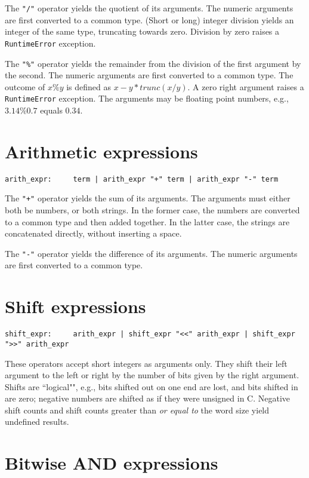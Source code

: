 The \verb|"/"| operator yields the quotient of its arguments.
The numeric arguments are first converted to a common type.
(Short or long) integer division yields an integer of the same type,
truncating towards zero.
Division by zero raises a {\tt RuntimeError} exception.

The \verb|"%"| operator yields the remainder from the division
of the first argument by the second.
The numeric arguments are first converted to a common type.
The outcome of $x \% y$ is defined as $x - y*trunc(x/y)$.
A zero right argument raises a {\tt RuntimeError} exception.
The arguments may be floating point numbers, e.g.,
$3.14 \% 0.7$ equals $0.34$.

\section{Arithmetic expressions}

\begin{verbatim}
arith_expr:     term | arith_expr "+" term | arith_expr "-" term
\end{verbatim}

The \verb|"+"| operator yields the sum of its arguments.
The arguments must either both be numbers, or both strings.
In the former case, the numbers are converted to a common type
and then added together.
In the latter case, the strings are concatenated directly,
without inserting a space.

The \verb|"-"| operator yields the difference of its arguments.
The numeric arguments are first converted to a common type.

\section{Shift expressions}

\begin{verbatim}
shift_expr:     arith_expr | shift_expr "<<" arith_expr | shift_expr ">>" arith_expr
\end{verbatim}

These operators accept short integers as arguments only.
They shift their left argument to the left or right by the number of bits
given by the right argument.  Shifts are ``logical"", e.g., bits shifted
out on one end are lost, and bits shifted in are zero;
negative numbers are shifted as if they were unsigned in C.
Negative shift counts and shift counts greater than {\em or equal to}
the word size yield undefined results.

\section{Bitwise AND expressions}

